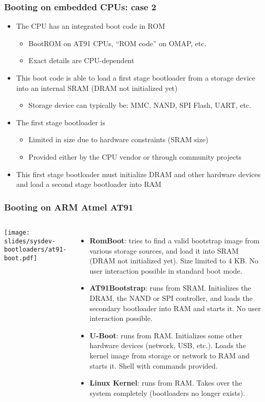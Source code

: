 \begin{frame}
  \frametitle{Booting on embedded CPUs: case 2}
  \begin{itemize}
  \item The CPU has an integrated boot code in ROM
    \begin{itemize}
    \item BootROM on AT91 CPUs, “ROM code” on OMAP, etc.
    \item Exact details are CPU-dependent
    \end{itemize}
  \item This boot code is able to load a first stage bootloader from a
    storage device into an internal SRAM (DRAM not initialized yet)
    \begin{itemize}
    \item Storage device can typically be: MMC, NAND, SPI Flash, UART,
      etc.
    \end{itemize}
  \item The first stage bootloader is
    \begin{itemize}
    \item Limited in size due to hardware constraints (SRAM size)
    \item Provided either by the CPU vendor or through community projects
    \end{itemize}
  \item This first stage bootloader must initialize DRAM and other
    hardware devices and load a second stage bootloader into RAM
  \end{itemize}
\end{frame}

\begin{frame}
  \frametitle{Booting on ARM Atmel AT91}
  \begin{columns}
    \texttt{[image: slides/sysdev-bootloaders/at91-boot.pdf]}
    \footnotesize
    \begin{itemize}
    \item {\bf RomBoot}: tries to find a valid bootstrap image from
      various storage sources, and load it into SRAM (DRAM not
      initialized yet). Size limited to 4 KB. No user interaction
      possible in standard boot mode.
    \item {\bf AT91Bootstrap}: runs from SRAM. Initializes the DRAM,
      the NAND or SPI controller, and loads the secondary bootloader
      into RAM and starts it. No user interaction possible.
    \item {\bf U-Boot}: runs from RAM. Initializes some other hardware
      devices (network, USB, etc.).  Loads the kernel image from
      storage or network to RAM and starts it. Shell with commands
      provided.
    \item {\bf Linux Kernel}: runs from RAM. Takes over the system
      completely (bootloaders no longer exists).
    \end{itemize}
  \end{columns}
\end{frame}

